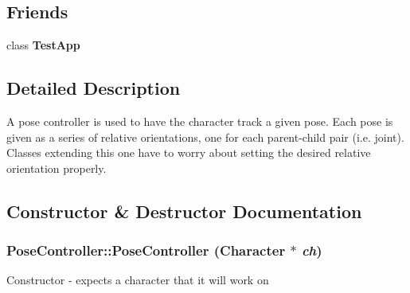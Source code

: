 \subsection*{Friends}
\begin{DoxyCompactItemize}
\item 
\hypertarget{classCartWheel_1_1Core_1_1PoseController_a53f540ec72017006b082b2cb716644c1}{
class {\bfseries TestApp}}
\label{classCartWheel_1_1Core_1_1PoseController_a53f540ec72017006b082b2cb716644c1}

\end{DoxyCompactItemize}


\subsection{Detailed Description}
A pose controller is used to have the character track a given pose. Each pose is given as a series of relative orientations, one for each parent-\/child pair (i.e. joint). Classes extending this one have to worry about setting the desired relative orientation properly. 

\subsection{Constructor \& Destructor Documentation}
\hypertarget{classCartWheel_1_1Core_1_1PoseController_af6c78505668fd7101f9ce8d74637763b}{
\subsubsection[{PoseController}]{\setlength{\rightskip}{0pt plus 5cm}PoseController::PoseController ({\bf Character} $\ast$ {\em ch})}}
\label{classCartWheel_1_1Core_1_1PoseController_af6c78505668fd7101f9ce8d74637763b}
Constructor -\/ expects a character that it will work on 

